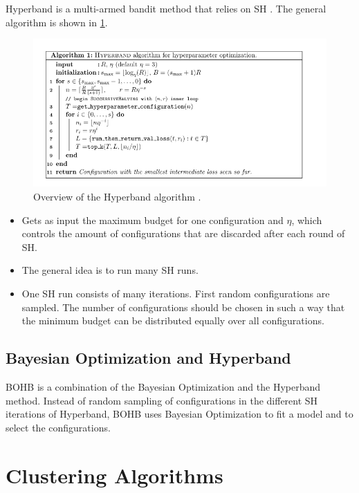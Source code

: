 Hyperband \cite{Li2017Hyperband:Optimization} is a multi-armed bandit method that relies on \gls{SH} \cite{Jamieson2015Non-stochasticOptimization}.
The general algorithm is shown in \cref{fig:HBAlgorithm}.
\begin{figure}
    \centering
    \includegraphics[width=\textwidth]{graphics/hyperband_algorithm.png}
    \caption{Overview of the Hyperband algorithm \cite{Li2017Hyperband:Optimization}.}
    \label{fig:HBAlgorithm}
\end{figure}

\begin{itemize}
    \item Gets as input the maximum budget for one configuration and $\eta$, which controls the amount of configurations that are discarded after each round of \gls{SH}.
    \item The general idea is to run many \gls{SH} runs.
    \item One SH run consists of many iterations. First random configurations are sampled.
    The number of configurations should be chosen in such a way that the minimum budget can be distributed equally over all configurations.
\end{itemize}

\subsection{Bayesian Optimization and Hyperband}

\gls{BOHB} is a combination of the Bayesian Optimization and the Hyperband method.
Instead of random sampling of configurations in the different \gls{SH} iterations of Hyperband, \gls{BOHB} uses Bayesian Optimization to fit a model and to select the configurations.
 

\section{Clustering Algorithms}

